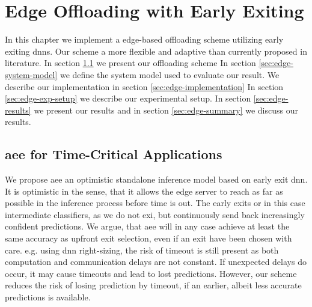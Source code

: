 \hypertarget{earlyexiting}{%
	\chapter{Edge Offloading with Early Exiting}\label{ch:edgeoffloading}}
\thispagestyle{fancy}

In this chapter we implement a edge-based offloading scheme utilizing early exiting \gls{dnn}s. Our scheme a more flexible and adaptive than currently proposed in literature. In section \ref{sec:edge-aee} we present our offloading scheme In section \ref{sec:edge-system-model} we define the system model used to evaluate our result. We describe our implementation in section \ref{sec:edge-implementation} In section \ref{sec:edge-exp-setup} we describe our experimental setup. In section \ref{sec:edge-results} we present our results and in section \ref{sec:edge-summary} we discuss our results.

\section{\acrfull{aee} for Time-Critical Applications} \label{sec:edge-aee}

We propose \acrfull{aee} an optimistic standalone inference model based on early exit \gls{dnn}. It is optimistic in the sense, that it allows the edge server to reach as far as possible in the inference process before time is out. The early exits or in this case intermediate classifiers, as we do not exi, but continuously send back increasingly confident predictions. We argue, that \gls{aee} will in any case achieve at least the same accuracy as upfront exit selection, even if an exit have been chosen with care.   e.g. using \gls{dnn} right-sizing, the risk of timeout is still present as both computation and communication delays are not constant. If unexpected delays do occur, it may cause timeouts and lead to lost predictions. However, our scheme reduces the risk of losing prediction by timeout, if an earlier, albeit less accurate predictions is available. 


